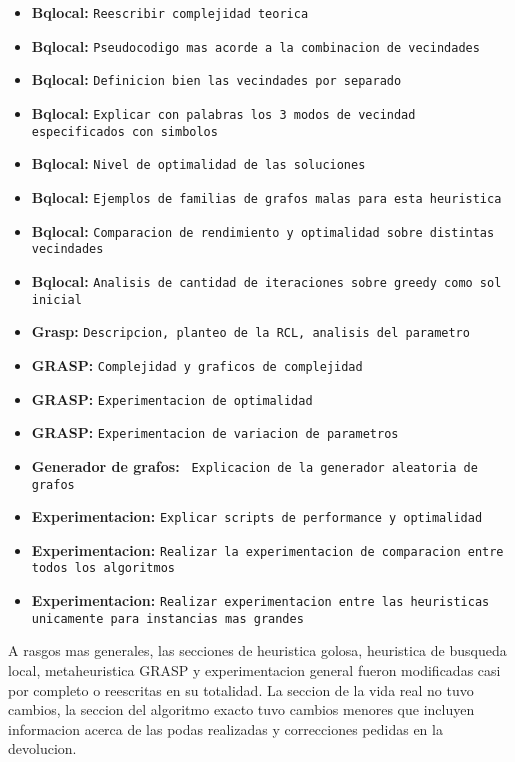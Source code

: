 \begin{itemize}
	\item \textbf{Bqlocal: } \texttt{Reescribir complejidad teorica}
	\item \textbf{Bqlocal: } \texttt{Pseudocodigo mas acorde a la combinacion de vecindades}
	\item \textbf{Bqlocal: } \texttt{Definicion bien las vecindades por separado}
	\item \textbf{Bqlocal: } \texttt{Explicar con palabras los 3 modos de vecindad especificados con simbolos}
	\item \textbf{Bqlocal: } \texttt{Nivel de optimalidad de las soluciones}
	\item \textbf{Bqlocal: } \texttt{Ejemplos de familias de grafos malas para esta heuristica}
	\item \textbf{Bqlocal: } \texttt{Comparacion de rendimiento y optimalidad sobre distintas vecindades}
	\item \textbf{Bqlocal: } \texttt{Analisis de cantidad de iteraciones sobre greedy como sol inicial}
	\item \textbf{Grasp: } \texttt{Descripcion, planteo de la RCL, analisis del parametro}
	\item \textbf{GRASP: } \texttt{Complejidad y graficos de complejidad}
	\item \textbf{GRASP: } \texttt{Experimentacion de optimalidad}
	\item \textbf{GRASP: } \texttt{Experimentacion de variacion de parametros}
	\item \textbf{Generador de grafos: }\texttt{ Explicacion de la generador aleatoria de grafos}
	\item \textbf{Experimentacion: } \texttt{Explicar scripts de performance y optimalidad}
	\item \textbf{Experimentacion: } \texttt{Realizar la experimentacion de comparacion entre todos los algoritmos}
	\item \textbf{Experimentacion: } \texttt{Realizar experimentacion entre las heuristicas unicamente para instancias mas grandes}
\end{itemize}

A rasgos mas generales, las secciones de heuristica golosa, heuristica de busqueda local, metaheuristica GRASP y experimentacion general fueron modificadas casi por completo o reescritas en su totalidad. La seccion de la vida real no tuvo cambios, la seccion del algoritmo exacto tuvo cambios menores que incluyen informacion acerca de las podas realizadas y correcciones pedidas en la devolucion.